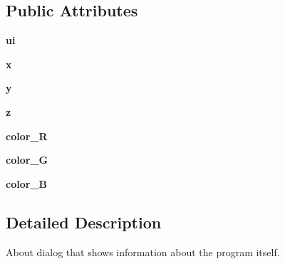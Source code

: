 \subsection*{Public Attributes}
\begin{DoxyCompactItemize}
\item 
\hypertarget{classDialogs_1_1AboutDialog_1_1AboutDialog_ace06b14a19aa92cb6cf0095c6e26ea25}{{\bfseries ui}}\label{classDialogs_1_1AboutDialog_1_1AboutDialog_ace06b14a19aa92cb6cf0095c6e26ea25}

\item 
\hypertarget{classDialogs_1_1AboutDialog_1_1AboutDialog_afdbd3594cf0ef9704e60d657a22db4ff}{{\bfseries x}}\label{classDialogs_1_1AboutDialog_1_1AboutDialog_afdbd3594cf0ef9704e60d657a22db4ff}

\item 
\hypertarget{classDialogs_1_1AboutDialog_1_1AboutDialog_af58d38e97765d2398cc2f7337864cee8}{{\bfseries y}}\label{classDialogs_1_1AboutDialog_1_1AboutDialog_af58d38e97765d2398cc2f7337864cee8}

\item 
\hypertarget{classDialogs_1_1AboutDialog_1_1AboutDialog_a1185381f4c28ec38fc3457b078a4739e}{{\bfseries z}}\label{classDialogs_1_1AboutDialog_1_1AboutDialog_a1185381f4c28ec38fc3457b078a4739e}

\item 
\hypertarget{classDialogs_1_1AboutDialog_1_1AboutDialog_a935e7f3ac0a659f1ce7a51ac4ad607b9}{{\bfseries color\-\_\-\-R}}\label{classDialogs_1_1AboutDialog_1_1AboutDialog_a935e7f3ac0a659f1ce7a51ac4ad607b9}

\item 
\hypertarget{classDialogs_1_1AboutDialog_1_1AboutDialog_a374f448efb72ae5c4f8c75a78bfb8424}{{\bfseries color\-\_\-\-G}}\label{classDialogs_1_1AboutDialog_1_1AboutDialog_a374f448efb72ae5c4f8c75a78bfb8424}

\item 
\hypertarget{classDialogs_1_1AboutDialog_1_1AboutDialog_a2b09bdcfe10fa2234e995ebb340c93b8}{{\bfseries color\-\_\-\-B}}\label{classDialogs_1_1AboutDialog_1_1AboutDialog_a2b09bdcfe10fa2234e995ebb340c93b8}

\end{DoxyCompactItemize}


\subsection{Detailed Description}
\begin{DoxyVerb}About dialog that shows information about the program itself.
\end{DoxyVerb}
 

